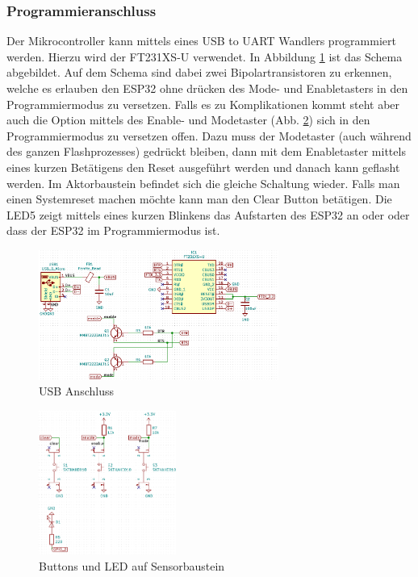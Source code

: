 \subsubsection{Programmieranschluss}
\label{par: Programmieranschluss}
Der Mikrocontroller kann mittels eines USB to UART Wandlers programmiert werden. Hierzu wird der FT231XS-U verwendet. In Abbildung \ref{pic: USB Anschluss} ist das Schema abgebildet. Auf dem Schema sind dabei zwei Bipolartransistoren zu erkennen, welche es erlauben den ESP32 ohne drücken des Mode- und Enabletasters in den Programmiermodus zu versetzen. Falls es zu Komplikationen kommt steht aber auch die Option mittels des Enable- und Modetaster (Abb. \ref{pic: sensor_progrmmierbuttons}) sich in den Programmiermodus zu versetzen offen. Dazu muss der Modetaster (auch während des ganzen Flashprozesses) gedrückt bleiben, dann mit dem Enabletaster mittels eines kurzen Betätigens den Reset ausgeführt werden und danach kann geflasht werden. Im Aktorbaustein befindet sich die gleiche Schaltung wieder. Falls man einen Systemreset machen möchte kann man den Clear Button betätigen. Die LED5 zeigt mittels eines kurzen Blinkens das Aufstarten des ESP32 an oder oder dass der ESP32 im Programmiermodus ist.
\begin{figure}[h!]
	\centering
	\includegraphics[width=0.7\textwidth]{graphics/shematics_usb.png}
	\caption{USB Anschluss}
	\label{pic: USB Anschluss}
\end{figure}
\begin{figure}[h!]
	\centering
	\includegraphics[width=0.4\textwidth]{graphics/shematics_sensor_buttons_LED.png}
	\caption{Buttons und LED auf Sensorbaustein}
	\label{pic: sensor_progrmmierbuttons}
\end{figure}


